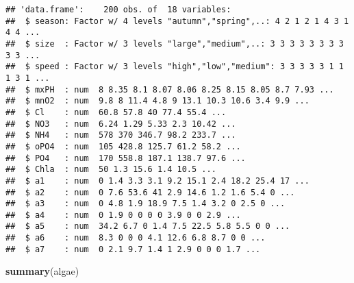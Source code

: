 \documentclass[
]{article}
\newenvironment{Shaded}{\begin{snugshade}}{\end{snugshade}}
\newcommand{\KeywordTok}[1]{\textcolor[rgb]{0.13,0.29,0.53}{\textbf{#1}}}
\newcommand{\NormalTok}[1]{#1}
\begin{document}
\begin{verbatim}
## 'data.frame':    200 obs. of  18 variables:
##  $ season: Factor w/ 4 levels "autumn","spring",..: 4 2 1 2 1 4 3 1 4 4 ...
##  $ size  : Factor w/ 3 levels "large","medium",..: 3 3 3 3 3 3 3 3 3 3 ...
##  $ speed : Factor w/ 3 levels "high","low","medium": 3 3 3 3 3 1 1 1 3 1 ...
##  $ mxPH  : num  8 8.35 8.1 8.07 8.06 8.25 8.15 8.05 8.7 7.93 ...
##  $ mnO2  : num  9.8 8 11.4 4.8 9 13.1 10.3 10.6 3.4 9.9 ...
##  $ Cl    : num  60.8 57.8 40 77.4 55.4 ...
##  $ NO3   : num  6.24 1.29 5.33 2.3 10.42 ...
##  $ NH4   : num  578 370 346.7 98.2 233.7 ...
##  $ oPO4  : num  105 428.8 125.7 61.2 58.2 ...
##  $ PO4   : num  170 558.8 187.1 138.7 97.6 ...
##  $ Chla  : num  50 1.3 15.6 1.4 10.5 ...
##  $ a1    : num  0 1.4 3.3 3.1 9.2 15.1 2.4 18.2 25.4 17 ...
##  $ a2    : num  0 7.6 53.6 41 2.9 14.6 1.2 1.6 5.4 0 ...
##  $ a3    : num  0 4.8 1.9 18.9 7.5 1.4 3.2 0 2.5 0 ...
##  $ a4    : num  0 1.9 0 0 0 0 3.9 0 0 2.9 ...
##  $ a5    : num  34.2 6.7 0 1.4 7.5 22.5 5.8 5.5 0 0 ...
##  $ a6    : num  8.3 0 0 0 4.1 12.6 6.8 8.7 0 0 ...
##  $ a7    : num  0 2.1 9.7 1.4 1 2.9 0 0 0 1.7 ...
\end{verbatim}

\begin{Shaded}
\begin{Highlighting}[]
\KeywordTok{summary}\NormalTok{(algae)}
\end{Highlighting}
\end{Shaded}
\end{document}

